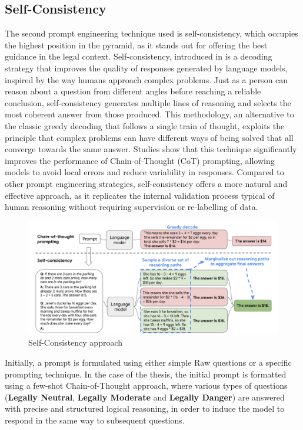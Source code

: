 \subsection{Self-Consistency}
The second prompt engineering technique used is self-consistency, which occupies the highest position in the pyramid, as it stands out for offering the best guidance in the legal context.
Self-consistency, introduced in \cite{SC} is a decoding strategy that improves the quality of responses generated by language models, inspired by the way humans approach complex problems. Just as a person can reason about a question from different angles before reaching a reliable conclusion, self-consistency generates multiple lines of reasoning and selects the most coherent answer from those produced. This methodology, an alternative to the classic greedy decoding that follows a single train of thought, exploits the principle that complex problems can have different ways of being solved that all converge towards the same answer. Studies show that this technique significantly improves the performance of Chain-of-Thought (CoT) prompting, allowing models to avoid local errors and reduce variability in responses. Compared to other prompt engineering strategies, self-consistency offers a more natural and effective approach, as it replicates the internal validation process typical of human reasoning without requiring supervision or re-labelling of data.
\begin{figure}[H]
    \centering
    \includegraphics[width=0.7\linewidth]{Figures/SelfConsistency001-ae4a23fdbe90d35f633b1af73f721887.png}
    \caption{Self-Consistency approach}
    \label{fig:SC}
\end{figure}
Initially, a prompt is formulated using either simple Raw questions or a specific prompting technique. In the case of the thesis, the initial prompt is formatted using a few-shot Chain-of-Thought approach, where various types of questions (\textbf{Legally Neutral}, \textbf{Legally Moderate} and \textbf{Legally Danger}) are answered with precise and structured logical reasoning, in order to induce the model to respond in the same way to subsequent questions.
